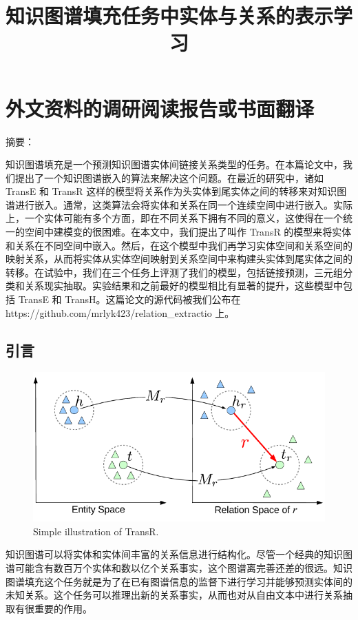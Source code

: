 \chapter{外文资料的调研阅读报告或书面翻译}

\title{知识图谱填充任务中实体与关系的表示学习}

{\heiti 摘要：} 

知识图谱填充是一个预测知识图谱实体间链接关系类型的任务。在本篇论文中，我们提出了一个知识图谱嵌入的算法来解决这个问题。在最近的研究中，诸如 TransE 和 TransR 这样的模型将关系作为头实体到尾实体之间的转移来对知识图谱进行嵌入。通常，这类算法会将实体和关系在同一个连续空间中进行嵌入。实际上，一个实体可能有多个方面，即在不同关系下拥有不同的意义，这使得在一个统一的空间中建模变的很困难。在本文中，我们提出了叫作 TransR 的模型来将实体和关系在不同空间中嵌入。然后，在这个模型中我们再学习实体空间和关系空间的映射关系，从而将实体从实体空间映射到关系空间中来构建头实体到尾实体之间的转移。在试验中，我们在三个任务上评测了我们的模型，包括链接预测，三元组分类和关系现实抽取。实验结果和之前最好的模型相比有显著的提升，这些模型中包括 TransE 和 TransH。这篇论文的源代码被我们公布在 https://github.com/mrlyk423/relation\_extractio 上。

\section{引言}

  \begin{figure}[htb]
  \centering
  \includegraphics[width=0.8\columnwidth]{figures/trans/model_idea}
  \caption{Simple illustration of TransR.}
  \label{fig_1:idea}
  \end{figure}

知识图谱可以将实体和实体间丰富的关系信息进行结构化。尽管一个经典的知识图谱可能含有数百万个实体和数以亿个关系事实，这个图谱离完善还差的很远。知识图谱填充这个任务就是为了在已有图谱信息的监督下进行学习并能够预测实体间的未知关系。这个任务可以推理出新的关系事实，从而也对从自由文本中进行关系抽取有很重要的作用。

